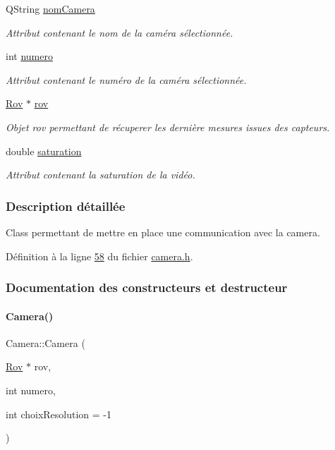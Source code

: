 \begin{DoxyCompactItemize}
Q\+String \hyperlink{class_camera_ac1cdaf82921d2a2f3f941d867718eba2}{nom\+Camera}
\begin{DoxyCompactList}\small\item\em Attribut contenant le nom de la caméra sélectionnée. \end{DoxyCompactList}\item 
int \hyperlink{class_camera_ae5cda5df3c9c49b88fff15389a1bbc64}{numero}
\begin{DoxyCompactList}\small\item\em Attribut contenant le numéro de la caméra sélectionnée. \end{DoxyCompactList}\item 
\hyperlink{class_rov}{Rov} $\ast$ \hyperlink{class_camera_ad1dde4d981877001281af01c392307f1}{rov}
\begin{DoxyCompactList}\small\item\em Objet rov permettant de récuperer les dernière mesures issues des capteurs. \end{DoxyCompactList}\item 
double \hyperlink{class_camera_afd46d6d2451ee33b68dbc74713f2687c}{saturation}
\begin{DoxyCompactList}\small\item\em Attribut contenant la saturation de la vidéo. \end{DoxyCompactList}\end{DoxyCompactItemize}


\subsubsection{Description détaillée}
Class permettant de mettre en place une communication avec la camera. 

Définition à la ligne \hyperlink{camera_8h_source_l00058}{58} du fichier \hyperlink{camera_8h_source}{camera.\+h}.



\subsubsection{Documentation des constructeurs et destructeur}
\mbox{\label{class_camera_a26c49f76c98ece6ad6771351dd13583a}} 
\paragraph{\texorpdfstring{Camera()}{Camera()}\hspace{0.1cm}{\footnotesize\ttfamily [1/2]}}
{\footnotesize\ttfamily Camera\+::\+Camera (\begin{DoxyParamCaption}\item[{\hyperlink{class_rov}{Rov} $\ast$}]{rov,  }\item[{int}]{numero,  }\item[{int}]{choix\+Resolution = {\ttfamily -\/1} }\end{DoxyParamCaption})}



